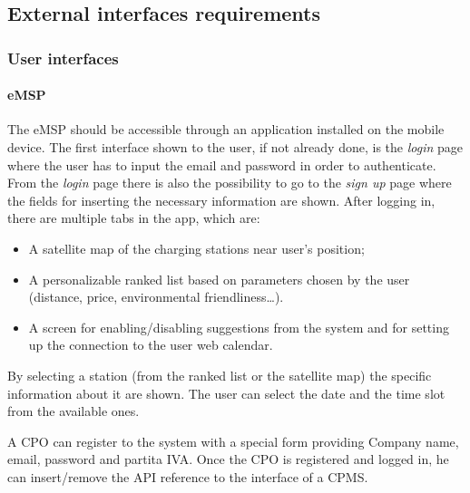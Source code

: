 \subsection{External interfaces requirements}

\subsubsection{User interfaces}
\paragraph{\ac{eMSP}}
The \ac{eMSP} should be accessible through an application installed on the mobile device.
The first interface shown to the user, if not already done, is the \textit{login} page where the user has to input the email and password in order to authenticate.
From the \textit{login} page there is also the possibility to go to the \textit{sign up} page where the fields for inserting the necessary information are shown.
After logging in, there are multiple tabs in the app, which are:
\begin{itemize}
    \item A satellite map of the charging stations near user's position;
    \item A personalizable ranked list based on parameters chosen by the user (distance, price, environmental friendliness\ldots).
    \item A screen for enabling/disabling suggestions from the system and for setting up the connection to the user web calendar.
\end{itemize}
By selecting a station (from the ranked list or the satellite map) the specific information about it are shown. The user can select the date and the time slot from the available ones.

A \ac{CPO} can register to the system with a special form providing Company name, email, password and \gls{partita IVA}. Once the \ac{CPO} is registered and logged in, he can insert/remove the \ac{API} reference to the interface of a \ac{CPMS}.

